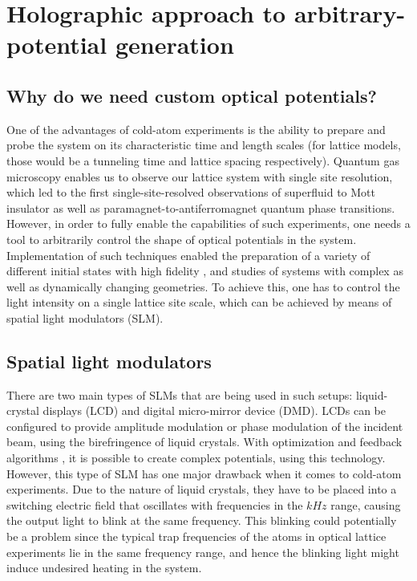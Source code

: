 
\chapter{Holographic approach to arbitrary-potential generation}

\section{Why do we need custom optical potentials?}
One of the advantages of cold-atom experiments is the ability to prepare and probe the system on its characteristic time and length scales (for lattice models, those would be a tunneling time and lattice spacing respectively). Quantum gas microscopy enables us to observe our lattice system with single site resolution, which led to the first single-site-resolved observations of superfluid to Mott insulator \cite{Bakr2010, Sherson2010} as well as paramagnet-to-antiferromagnet \cite{Simon2011, Mazurenko2017} quantum phase transitions. However, in order to fully enable the capabilities of such experiments, one needs a tool to arbitrarily control the shape of optical potentials in the system. Implementation of such techniques enabled the preparation of a variety of different initial states with high fidelity \cite{Preiss2015}, and studies of systems with complex \cite{Husmann2015, Valtolina2015} as well as dynamically changing \cite{Boyer2006} geometries. To achieve this, one has to control the light intensity on a single lattice site scale, which can be achieved by means of spatial light modulators (SLM).

\section{Spatial light modulators}
There are two main types of SLMs that are being used in such setups: liquid-crystal displays (LCD) and digital micro-mirror device (DMD). LCDs can be configured to provide amplitude modulation or phase modulation of the incident beam, using the birefringence of liquid crystals. With optimization and feedback algorithms \cite{Gaunt2012, Nogrette2014}, it is possible to create complex potentials, using this technology. However, this type of SLM has one major drawback when it comes to cold-atom experiments. Due to the nature of liquid crystals, they have to be placed into a switching electric field that oscillates with frequencies in the $kHz$ range, causing the output light to blink at the same frequency. This blinking could potentially be a problem since the typical trap frequencies of the atoms in optical lattice experiments lie in the same frequency range, and hence the blinking light might induce undesired heating in the system.

